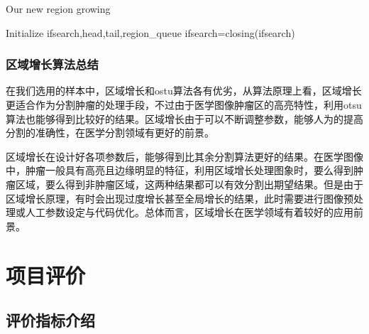 \documentclass[UTF8]{ctexart}
\begin{document}
    \begin{algorithm}[H]
        \caption{Our new region growing}\label{algorithm}
        Initialize ifsearch,head,tail,region\_queue\;
        ifsearch=closing(ifsearch)
    \end{algorithm}

    

    \subsubsection{区域增长算法总结}
    在我们选用的样本中，区域增长和ostu算法各有优劣，从算法原理上看，区域增长更适合作为分割肿瘤的处理手段，不过由于医学图像肿瘤区的高亮特性，利用otsu算法也能够得到比较好的结果。区域增长由于可以不断调整参数，能够人为的提高分割的准确性，在医学分割领域有更好的前景。

	区域增长在设计好各项参数后，能够得到比其余分割算法更好的结果。在医学图像中，肿瘤一般具有高亮且边缘明显的特征，利用区域增长处理图象时，要么得到肿瘤区域，要么得到非肿瘤区域，这两种结果都可以有效分割出期望结果。但是由于区域增长原理，有时会出现过度增长甚至全局增长的结果，此时需要进行图像预处理或人工参数设定与代码优化。总体而言，区域增长在医学领域有着较好的应用前景。



\section{项目评价}
\subsection{评价指标介绍}
	
\end{document}
